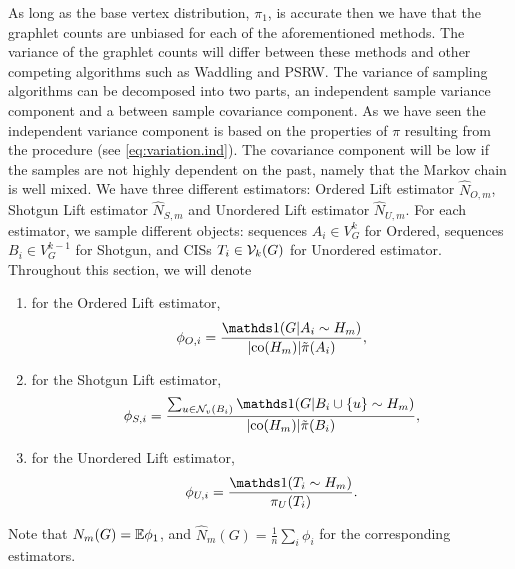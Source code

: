 As long as the base vertex distribution, $\pi_1$, is accurate then we have that the graphlet counts are unbiased for each of the aforementioned methods.
The variance of the graphlet counts will differ between these methods and other competing algorithms such as Waddling and PSRW.
The variance of sampling algorithms can be decomposed into two parts, an independent sample variance component and a between sample covariance component.
As we have seen the independent variance component is based on the properties of $\pi$ resulting from the procedure (see \eqref{eq:variation.ind}).
The covariance component will be low if the samples are not highly dependent on the past, namely that the Markov chain is well mixed.
We have three different estimators: Ordered Lift estimator $\hat N_{O,m}$, Shotgun Lift estimator $\hat N_{S,m}$ and Unordered Lift estimator $\hat N_{U,m}$.
For each estimator, we sample different objects: sequences $A_i \in V_G^k$ for Ordered, sequences $B_i \in V_G^{k-1}$ for Shotgun, and CISs $T_i\in \mathcal{V}_k(G)$ for Unordered estimator.
Throughout this section, we will denote 
\begin{enumerate}
    \item for the Ordered Lift estimator,
    \begin{equation}
    \label{phi:ord}
        \phi_{O,i} = \frac{\ind(G|A_i\sim H_m)}{|\co(H_m)|\tilde\pi(A_i)},
    \end{equation} 
    
    \item for the Shotgun Lift estimator,
    \begin{equation}
    \label{phi:shot}
        \phi_{S,i} =  \frac{\sum_{u \in \cN_v(B_i)} \ind(G|B_i \cup \{u\} \sim H_m)}{|\co(H_m)| \tilde \pi(B_i)},
    \end{equation}
    
    \item for the Unordered Lift estimator,
    \begin{equation}
    \label{phi:unord}
        \phi_{U,i} = \frac{\ind(T_i\sim H_m)}{\pi_U(T_i)}.
    \end{equation}
    
\end{enumerate}

Note that $N_m(G) = \mathbb{E} \phi_1$, and $\hat N_m(G) = \frac{1}{n}\sum_i \phi_i$ for the corresponding estimators.



